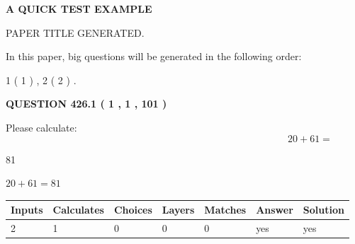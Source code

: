 \documentclass[12pt]{article}
\begin{document}
   
\vspace{0.2in}
   
   
   
   
   
   
   
   
 \vspace{0.2in}
{\LARGE {\textbf{ A QUICK TEST EXAMPLE}}}
   
   
 PAPER TITLE GENERATED.
   
   
   
\vspace{0.2in}
   
In this paper, big questions will be generated in the following order: 
   
   
   1 ( 1 )
 ,
   2 ( 2 )
 .
  
\vspace{0.2in}
  
{\textbf{\Large{QUESTION
426.1 
 ( 1 , 1 , 101 )
}}}
  
  
 
Please calculate:
\begin{equation}
20 +  %
61 = \nonumber
\end{equation}
 
 
 
\noindent{}
 
 

81
 
 
\noindent{}
 
 

 
 
 
\noindent{}
 
 

$ %
20 +  %
61=   %
81$
 
 
\noindent{}
 
 

 
   
   
   
   
\noindent\begin{tabular}{|l|l|l|l|l|l|l|}
 \hline
Inputs & Calculates & Choices & Layers & Matches & Answer & Solution \\ \hline
 2  & 
 1  & 
 0
  & 
 0  & 
 0  & 
  yes & 
  yes 
  \\ \hline
 \end{tabular}
   
\end{document}
